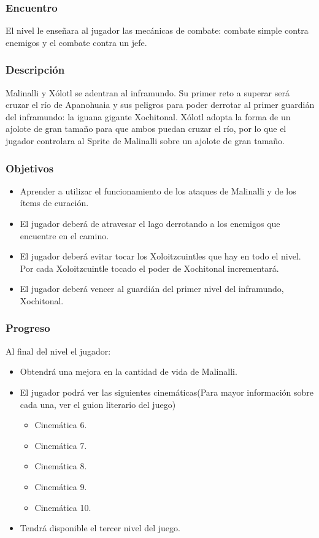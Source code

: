 \documentclass[11pt,letterpaper]{article}
\begin{document}
	\subsubsection{Encuentro}
El nivel le enseñara al jugador las mecánicas de combate: combate simple contra enemigos y el combate contra un jefe. 
	\subsubsection{Descripción}
Malinalli y Xólotl se adentran al inframundo. Su primer reto a superar será cruzar el río de Apanohuaia y sus peligros para poder derrotar al primer guardián del inframundo: la iguana gigante Xochitonal. Xólotl adopta la forma de un ajolote de gran tamaño para que ambos puedan cruzar el río, por lo que el jugador controlara al Sprite de Malinalli sobre un ajolote de gran tamaño. 
	\subsubsection{Objetivos}
\begin{itemize}
	\item Aprender a utilizar el funcionamiento de los ataques de Malinalli y de los ítems de curación.
	\item El jugador deberá de atravesar el lago derrotando a los enemigos que encuentre en el camino.
	\item El jugador deberá evitar tocar los Xoloitzcuintles que hay en todo el nivel. Por cada Xoloitzcuintle tocado el poder de Xochitonal incrementará.
	\item El jugador deberá vencer al guardián del primer nivel del inframundo, Xochitonal.
\end{itemize}
	\subsubsection{Progreso}
Al final del nivel el jugador:
\begin{itemize}
	\item Obtendrá una mejora en la cantidad de vida de Malinalli.
	\item El jugador podrá ver las siguientes cinemáticas(Para mayor información sobre cada una, ver el guion literario del juego)
		\begin{itemize}
			\item Cinemática 6.
			\item Cinemática 7.
			\item Cinemática 8.
			\item Cinemática 9.
			\item Cinemática 10.
		\end{itemize}
	\item Tendrá disponible el tercer nivel del juego. 
\end{itemize}
\end{document}
